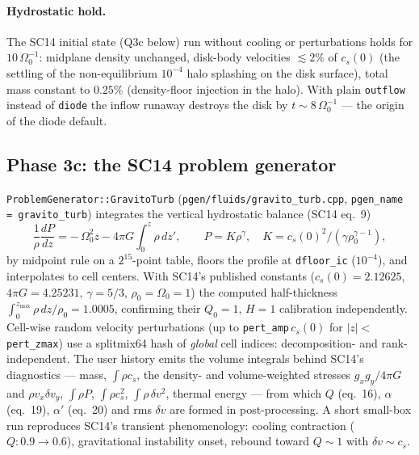 \documentclass[11pt]{article}
\newcommand{\code}[1]{\texttt{#1}}
\newcommand{\file}[1]{\texttt{\small #1}}
\newcommand{\fn}[1]{\texttt{\small #1}}
\newcommand{\Om}{\Omega_0}
\begin{document}
\paragraph{Hydrostatic hold.} The SC14 initial state (Q3c below) run without cooling
or perturbations holds for $10\,\Om^{-1}$: midplane density unchanged, disk-body
velocities $\lesssim 2\%$ of $c_s(0)$ (the settling of the non-equilibrium
$10^{-4}$ halo splashing on the disk surface), total mass constant to $0.25\%$
(density-floor injection in the halo). With plain \code{outflow} instead of
\code{diode} the inflow runaway destroys the disk by $t \sim 8\,\Om^{-1}$ ---
the origin of the diode default.

\subsection{Phase 3c: the SC14 problem generator}
\label{sec:phase3c}

\fn{ProblemGenerator::GravitoTurb} (\file{pgen/fluids/gravito\_turb.cpp},
\code{pgen\_name\,=\,gravito\_turb}) integrates the vertical hydrostatic balance
(SC14 eq.~9)
\begin{equation}
  \frac{1}{\rho}\frac{dP}{dz} = -\,\Om^2 z - 4\pi G \int_0^z \rho\,dz',
  \qquad P = K\rho^\gamma,\quad K = c_s(0)^2/(\gamma\rho_0^{\gamma-1}),
\end{equation}
by midpoint rule on a $2^{15}$-point table, floors the profile at \code{dfloor\_ic}
($10^{-4}$), and interpolates to cell centers. With SC14's published constants
($c_s(0) = 2.12625$, $4\pi G = 4.25231$, $\gamma = 5/3$, $\rho_0 = \Om = 1$) the
computed half-thickness $\int_0^{z_{\max}}\rho\,dz/\rho_0 = 1.0005$, confirming their
$Q_0 = 1$, $H = 1$ calibration independently. Cell-wise random velocity
perturbations (up to \code{pert\_amp}$\,c_s(0)$ for $|z| <$ \code{pert\_zmax}) use a
splitmix64 hash of \emph{global} cell indices: decomposition- and rank-independent.
The user history emits the volume integrals behind SC14's diagnostics --- mass,
$\int\rho c_s$, the density- and volume-weighted stresses $g_xg_y/4\pi G$ and
$\rho v_x\delta v_y$, $\int\rho P$, $\int\rho c_s^2$, $\int\rho\,\delta v^2$, thermal
energy --- from which $Q$ (eq.~16), $\alpha$ (eq.~19), $\alpha'$ (eq.~20) and rms
$\delta v$ are formed in post-processing. A short small-box run reproduces SC14's
transient phenomenology: cooling contraction ($Q: 0.9 \to 0.6$), gravitational
instability onset, rebound toward $Q \sim 1$ with $\delta v \sim c_s$.

\end{document}
